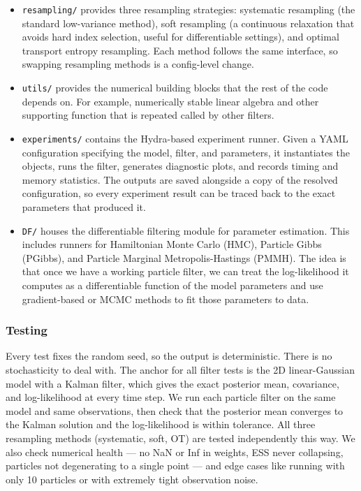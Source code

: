 \documentclass{article}
\begin{document}
\begin{itemize}
    \item \texttt{resampling/} provides three resampling strategies: systematic resampling (the standard low-variance method), soft resampling (a continuous relaxation that avoids hard index selection, useful for differentiable settings), and optimal transport entropy resampling. Each method follows the same interface, so swapping resampling methods is a config-level change.
    \item \texttt{utils/} provides the numerical building blocks that the rest of the code depends on. For example, numerically stable linear algebra and other supporting function that is repeated called by other filters.
      \item \texttt{experiments/} contains the Hydra-based experiment runner. Given a YAML configuration specifying the model, filter, and parameters, it instantiates the objects, runs the filter, generates diagnostic plots, and records timing and memory statistics. The outputs are saved alongside a copy of the resolved configuration, so every experiment result can be traced back to the exact parameters that produced it.
    \item \texttt{DF/} houses the differentiable filtering module for parameter estimation. This includes runners for Hamiltonian Monte Carlo (HMC), Particle Gibbs (PGibbs), and Particle Marginal Metropolis-Hastings (PMMH). The idea is that once we have a working particle filter, we can treat the log-likelihood it computes as a differentiable function of the model parameters and use gradient-based or MCMC methods to fit those parameters to data.
\end{itemize}

\subsubsection{Testing}

Every test fixes the random seed, so the output is deterministic. There is no stochasticity to deal with. The anchor for all filter tests is the 2D linear-Gaussian model with a Kalman filter, which gives the exact posterior mean, covariance, and log-likelihood at every time step. We run each particle filter on the same model and same observations, then check that the posterior mean converges to the Kalman solution and the log-likelihood is within tolerance. All three resampling methods (systematic, soft, OT) are tested independently this way. We also check numerical health --- no NaN or Inf in weights, ESS never collapsing, particles not degenerating to a single point --- and edge cases like running with only 10 particles or with extremely tight observation noise.
\end{document}
